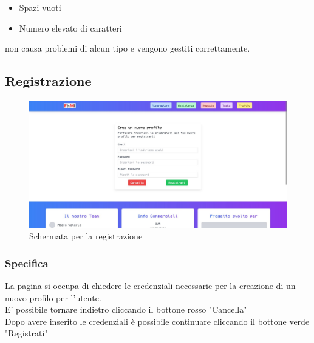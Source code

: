\documentclass{report}
\begin{document}
\begin{itemize}
	\item Spazi vuoti
	\item Numero elevato di caratteri
\end{itemize}
non causa problemi di alcun tipo e vengono gestiti correttamente.


\subsection{Registrazione}

\begin{figure}[H]
	\centering\includegraphics[width=1\textwidth]{images/microservizio-autenticazione/frontend/registrazione.jpg}
	Schermata per la registrazione
\end{figure}
\subsubsection*{Specifica}
La pagina si occupa di chiedere le credenziali necessarie per la creazione di un nuovo profilo per l'utente.\\
E' possibile tornare indietro cliccando il bottone rosso "Cancella"\\
Dopo avere inserito le credenziali è possibile continuare cliccando il bottone verde "Registrati"
\end{document}
